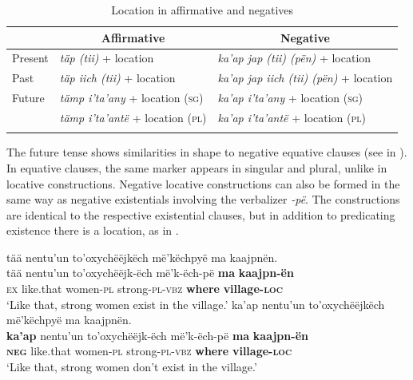 \documentclass[output=paper,colorlinks,citecolor=brown,draft]{langscibook}
\begin{document}
\begin{table}
\small 
\begin{tabularx}{\textwidth}{Xllll}
\lsptoprule
& \multicolumn{2}{c}{{Affirmative}} & \multicolumn{2}{c}{{Negative}}\\
\midrule
{Present} & \multicolumn{2}{l}{{\textit{täp ({tii})} + location}} & \multicolumn{2}{l}{{\textit{ka’ap jap (tii) (pën)} + location}}\\
\tablevspace
{Past} & \multicolumn{2}{l}{{\textit{täp iich (tii)} + location}} & \multicolumn{2}{l}{{\textit{ka’ap jap iich (tii) (pën)} + location}}\\
\tablevspace
 {Future} & \multicolumn{2}{l}{\textit{tämp i'ta’any} + location \textsc{(sg)}}  & \multicolumn{2}{l}{\textit{ka’ap i'ta’any} + location \textsc{(sg)}} \\
& \multicolumn{2}{l}{\textit{tämp i'ta’antë} + location \textsc{(pl)}}& \multicolumn{2}{l}{{\textit{ka’ap i'ta’antë} + location \textsc{(pl)}}}\\
\lspbottomrule
\end{tabularx}
\caption{Location in affirmative and negatives}
\label{tab:mix:7}
\end{table}

The future tense shows similarities in shape to negative equative clauses (see  in ). In equative clauses, the same marker appears in singular and plural, unlike in locative constructions. Negative locative constructions can also be formed in the same way as negative existentials involving the verbalizer \textit{{}-pë}. The constructions are identical to the respective existential clauses, but in addition to predicating existence there is a location, as in .

\ea\label{ex:mix:72}
    \ea\label{ex:mix:72a}
        \glll tää nentu’un to’oxychëëjkëch më’këchpyë ma kaajpnën.\\ 
              tää nentu’un to’oxychëëjk-ëch më’k-ëch-pë \textbf{ma} \textbf{kaajpn-ën}\\
             \textsc{ex} like.that women-\textsc{pl} strong-\textsc{pl-vbz} \textbf{where} \textbf{village-\textsc{loc}}\\
        \glt ‘Like that, strong women exist in the village.’
    \ex\label{ex:mix:72b}
        \glll ka’ap nentu’un to’oxychëëjkëch më’këchpyë ma kaajpnën.\\
             \textbf{ka’ap} nentu’un to’oxychëëjk-ëch më’k-ëch-pë \textbf{ma} \textbf{kaajpn-ën}\\
             \textbf{\textsc{neg}} like.that women-\textsc{pl} strong-\textsc{pl-vbz} \textbf{where} \textbf{village-\textsc{loc}}\\
        \glt ‘Like that, strong women don’t exist in the village.’
    \z
\z 
\end{document}
